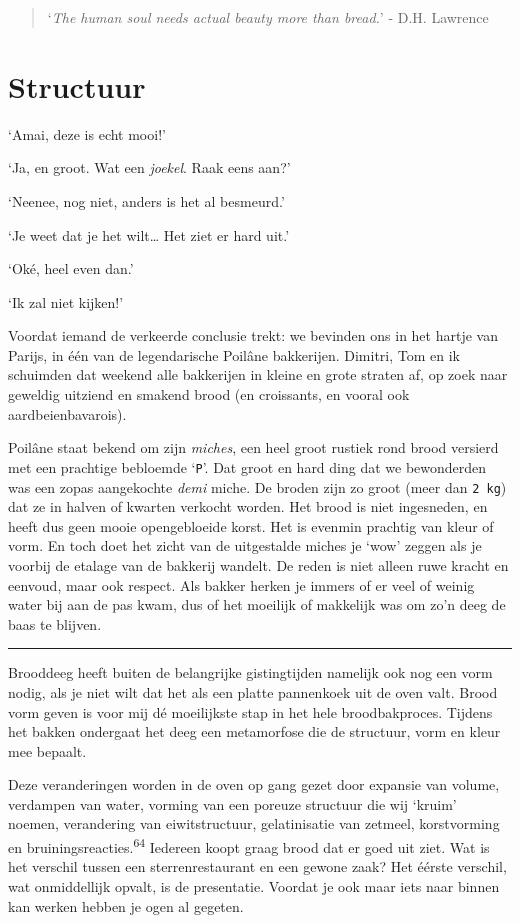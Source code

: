 \documentclass[
  11pt,
  dutch,
]{memoir}
\begin{document}
\begin{quote}
`\emph{The human soul needs actual beauty more than bread.}' - D.H.
\mbox{Lawrence}
\end{quote}

\hypertarget{structuur}{%
\section{Structuur}\label{structuur}}

`Amai, deze is echt mooi!'

`Ja, en groot. Wat een \emph{joekel}. Raak eens aan?'

`Neenee, nog niet, anders is het al besmeurd.'

`Je weet dat je het wilt\ldots{} Het ziet er hard uit.'

`Oké, heel even dan.'

`Ik zal niet kijken!'

Voordat iemand de verkeerde conclusie trekt: we bevinden ons in het
hartje van Parijs, in één van de legendarische Poilâne bakkerijen.
Dimitri, Tom en ik schuimden dat weekend alle bakkerijen in kleine en
grote straten af, op zoek naar geweldig uitziend en smakend brood (en
croissants, en vooral ook aardbeienbavarois).

Poilâne staat bekend om zijn \emph{miches}, een heel groot rustiek rond
brood versierd met een prachtige bebloemde `\texttt{P}'. Dat groot en
hard ding dat we bewonderden was een zopas aangekochte \emph{demi}
miche. De broden zijn zo groot (meer dan \texttt{2\ kg}) dat ze in
halven of kwarten verkocht worden. Het brood is niet ingesneden, en
heeft dus geen mooie opengebloeide korst. Het is evenmin prachtig van
kleur of vorm. En toch doet het zicht van de uitgestalde miches je `wow'
zeggen als je voorbij de etalage van de bakkerij wandelt. De reden is
niet alleen ruwe kracht en eenvoud, maar ook respect. Als bakker herken
je immers of er veel of weinig water bij aan de pas kwam, dus of het
moeilijk of makkelijk was om zo'n deeg de baas te blijven.

\pfbreak

Brooddeeg heeft buiten de belangrijke gistingtijden namelijk ook nog een
vorm nodig, als je niet wilt dat het als een platte pannenkoek uit de
oven valt. Brood vorm geven is voor mij dé moeilijkste stap in het hele
broodbakproces. Tijdens het bakken ondergaat het deeg een metamorfose
die de structuur, vorm en kleur mee bepaalt.

Deze veranderingen worden in de oven op gang gezet door expansie van
volume, verdampen van water, vorming van een poreuze structuur die wij
`kruim' noemen, verandering van eiwitstructuur, gelatinisatie van
zetmeel, korstvorming en bruiningsreacties.\textsuperscript{64} Iedereen
koopt graag brood dat er goed uit ziet. Wat is het verschil tussen een
sterrenrestaurant en een gewone zaak? Het éérste verschil, wat
onmiddellijk opvalt, is de presentatie. Voordat je ook maar iets naar
binnen kan werken hebben je ogen al gegeten.
\end{document}
